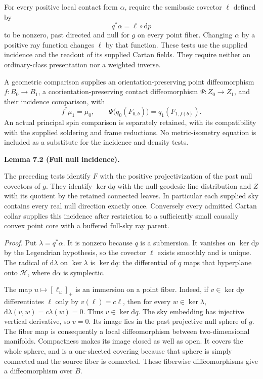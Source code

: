 \documentclass[
  english,
  11pt,
  reqno]{amsart}
\makeatletter
\newcommand{\pandocstatementheading}[1]{%
  \par\if@nobreak\else
    \addpenalty{\@beginparpenalty}%
    \addvspace{.5\baselineskip plus .2\baselineskip minus .2\baselineskip}%
  \fi
  {\normalfont\bfseries #1\par}%
  \nobreak\@afterindenttrue\@afterheading
}
\makeatother
\begin{document}
For every positive local contact form \(\alpha\), require the semibasic
covector \(\ell\) defined by%
 \[
q^*\alpha=\ell\circ\mathrm dp
\] to be nonzero, past directed and null for \(g\) on every point fiber.
Changing \(\alpha\) by a positive ray function changes \(\ell\) by that
function. These tests use the supplied incidence and the readout of its
supplied Cartan fields. They require neither an ordinary-class
presentation nor a weighted inverse.

A geometric comparison supplies an orientation-preserving point
diffeomorphism \(f:B_0\to B_1\), a coorientation-preserving contact
diffeomorphism \(\Psi:Z_0\to Z_1\), and their incidence comparison, with%
 \[
f^*\mu_1=\mu_0,\qquad
\Psi\bigl(q_0(F_{0,b})\bigr)=q_1(F_{1,f(b)}).
\] An actual principal spin comparison is separately retained, with its
compatibility with the supplied soldering and frame reductions. No
metric-isometry equation is included as a substitute for the incidence
and density tests.

\pandocstatementheading{\leavevmode{}\label{lem:online-incidence-identification}Lemma 7.2 (Full null incidence).}

The preceding tests identify \(F\) with the positive projectivization of
the past null covectors of \(g\). They identify \(\ker\mathrm dq\) with
the null-geodesic line distribution and \(Z\) with its quotient by the
retained connected leaves. In particular each supplied sky contains
every real null direction exactly once. Conversely every admitted Cartan
collar supplies this incidence after restriction to a sufficiently small
causally convex point core with a buffered full-sky ray parent.

\emph{Proof.} Put \(\lambda=q^*\alpha\). It is nonzero because \(q\) is
a submersion. It vanishes on \(\ker\mathrm dp\) by the Legendrian
hypothesis, so the covector \(\ell\) exists smoothly and is unique. The
radical of \(\mathrm d\lambda\) on \(\ker\lambda\) is
\(\ker\mathrm dq\): the differential of \(q\) maps that hyperplane onto
\(\mathcal H\), where \(\mathrm d\alpha\) is symplectic.

The map \(u\mapsto[\ell_u]_+\) is an immersion on a point fiber. Indeed,
if \(v\in\ker\mathrm dp\) differentiates \(\ell\) only by
\(v(\ell)=c\ell\), then for every \(w\in\ker\lambda\),
\(\mathrm d\lambda(v,w)=c\lambda(w)=0\). Thus \(v\in\ker\mathrm dq\).
The sky embedding has injective vertical derivative, so \(v=0\). Its
image lies in the past projective null sphere of \(g\). The fiber map is
consequently a local diffeomorphism between two-dimensional manifolds.
Compactness makes its image closed as well as open. It covers the whole
sphere, and is a one-sheeted covering because that sphere is simply
connected and the source fiber is connected. These fiberwise
diffeomorphisms give a diffeomorphism over \(B\).
\end{document}
